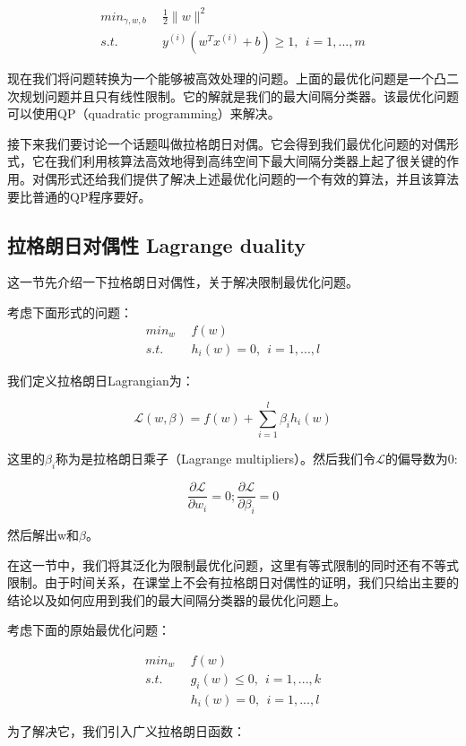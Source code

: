 \documentclass[UTF8]{ctexart}
\begin{document}
\begin{align*}
min_{\gamma,w,b} & \ \ \frac{1}{2}\|  w  \|^{2} \\
s.t. & \ \ y^{(i)}(w^{T}x^{(i)}+b) \geq 1,\ \ i=1,...,m
\end{align*}

现在我们将问题转换为一个能够被高效处理的问题。上面的最优化问题是一个凸二次规划问题并且只有线性限制。它的解就是我们的最大间隔分类器。该最优化问题可以使用QP（quadratic programming）来解决。

接下来我们要讨论一个话题叫做拉格朗日对偶。它会得到我们最优化问题的对偶形式，它在我们利用核算法高效地得到高纬空间下最大间隔分类器上起了很关键的作用。对偶形式还给我们提供了解决上述最优化问题的一个有效的算法，并且该算法要比普通的QP程序要好。


\subsection{拉格朗日对偶性 Lagrange duality}


这一节先介绍一下拉格朗日对偶性，关于解决限制最优化问题。

考虑下面形式的问题：
\begin{align*}
min_{w} & \ \ f(w) \\
s.t. & \ \ h_{i}(w)=0,\ \ i=1,...,l
\end{align*}

我们定义拉格朗日Lagrangian为：

\[\mathcal{L}(w,\beta) = f(w) + \sum_{i=1}^{l}\beta_{i}h_{i}(w) \]

这里的$\beta_{i}$称为是拉格朗日乘子（Lagrange multipliers）。然后我们令$\mathcal{L}$的偏导数为0:

\[\frac{\partial{\mathcal{L}}}{\partial{w_{i}}} =0 ;  \frac{\partial{\mathcal{L}}}{\partial{\beta_{i}}} =0 \]

然后解出w和$\beta$。

在这一节中，我们将其泛化为限制最优化问题，这里有等式限制的同时还有不等式限制。由于时间关系，在课堂上不会有拉格朗日对偶性的证明，我们只给出主要的结论以及如何应用到我们的最大间隔分类器的最优化问题上。

考虑下面的原始最优化问题：

\begin{align*}
min_{w} & \ \ f(w) \\
s.t. & \ \ g_{i}(w)\leq0,\ \ i=1,...,k\\
& \ \ h_{i}(w)=0,\ \ i=1,...,l
\end{align*}

为了解决它，我们引入广义拉格朗日函数：
\end{document}
